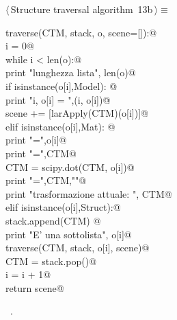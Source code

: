 \documentclass[11pt,oneside]{article}	%
\begin{document}
\begin{flushleft} \small \label{scrap27}
\protect{}$\langle\,$Structure traversal algorithm\nobreak\ {\footnotesize 13b}$\,\rangle\equiv$
\vspace{-1ex}
\begin{list}{}{} \item
\mbox{}\verb@def traverse(CTM, stack, o, scene=[]):@\\
\mbox{}\verb@    i = 0@\\
\mbox{}\verb@    while i < len(o):@\\
\mbox{}\verb@        print "lunghezza lista", len(o)@\\
\mbox{}\verb@        if isinstance(o[i],Model): @\\
\mbox{}\verb@            print "i, o[i] = ",(i, o[i])@\\
\mbox{}\verb@            scene += [larApply(CTM)(o[i])]@\\
\mbox{}\verb@        elif isinstance(o[i],Mat): @\\
\mbox{}\verb@            print "\no[i] =\n",o[i]@\\
\mbox{}\verb@            print "\nCTM =\n",CTM@\\
\mbox{}\verb@            CTM = scipy.dot(CTM, o[i])@\\
\mbox{}\verb@            print "\nCTM =\n",CTM,"\n"@\\
\mbox{}\verb@            print "trasformazione attuale: \n", CTM@\\
\mbox{}\verb@        elif isinstance(o[i],Struct):@\\
\mbox{}\verb@            stack.append(CTM) @\\
\mbox{}\verb@            print "E' una sottolista", o[i]@\\
\mbox{}\verb@            traverse(CTM, stack, o[i], scene)@\\
\mbox{}\verb@            CTM = stack.pop()@\\
\mbox{}\verb@        i = i + 1@\\
\mbox{}\verb@    return scene@\\
\mbox{}\verb@@{\NWsep}
\end{list}
\vspace{-1ex}
\footnotesize\addtolength{\baselineskip}{-1ex}
\begin{list}{}{\setlength{\itemsep}{-\parsep}\setlength{\itemindent}{-\leftmargin}}
\item \NWtxtMacroRefIn\ .
\end{list}
\end{flushleft}
  
\end{document}
